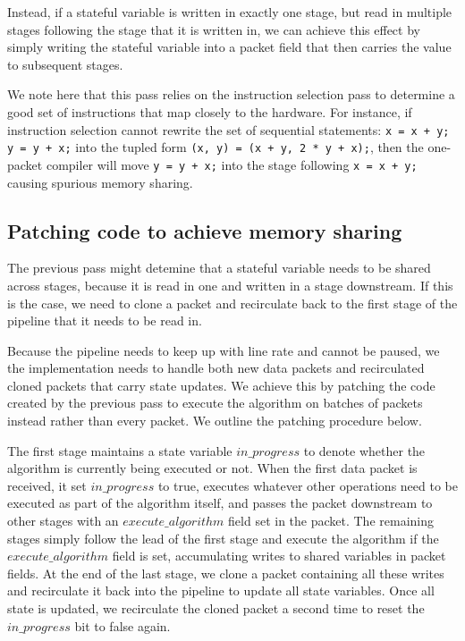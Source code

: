 Instead, if a stateful variable is written in exactly one stage, but read in
multiple stages following the stage that it is written in, we can achieve this
effect by simply writing the stateful variable into a packet field that then
carries the value to subsequent stages.

We note here that this pass relies on the instruction selection pass to
determine a good set of instructions that map closely to the hardware. For
instance, if instruction selection cannot rewrite the set of sequential
statements: \texttt{x = x + y; y = y + x;} into the tupled form \texttt{(x, y)
= (x + y, 2 * y + x);}, then the one-packet compiler will move \texttt{y = y +
x;} into the stage following \texttt{x = x + y;} causing spurious memory
sharing.

\subsection{Patching code to achieve memory sharing}
\label{ss:patching}
The previous pass might detemine that a stateful variable needs to be shared
across stages, because it is read in one and written in a stage downstream. If
this is the case, we need to clone a packet and recirculate back to the first
stage of the pipeline that it needs to be read in.

Because the pipeline needs to keep up with line rate and cannot be paused, we
the implementation needs to handle both new data packets and recirculated
cloned packets that carry state updates. We achieve this by patching the code
created by the previous pass to execute the algorithm on batches of packets
instead rather than every packet. We outline the patching procedure below.

The first stage maintains a state variable $in\_progress$ to denote whether the
algorithm is currently being executed or not. When the first data packet is
received, it set $in\_progress$ to true, executes whatever other operations
need to be executed as part of the algorithm itself, and passes the packet
downstream to other stages with an $execute\_algorithm$ field set in the
packet. The remaining stages simply follow the lead of the first stage and
execute the algorithm if the $execute\_algorithm$ field is set, accumulating
writes to shared variables in packet fields. At the end of the last stage, we
clone a packet containing all these writes and recirculate it back into the
pipeline to update all state variables. Once all state is updated, we
recirculate the cloned packet a second time to reset the $in\_progress$ bit to
false again.

